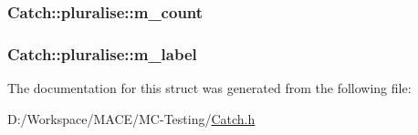 \subsubsection[{\texorpdfstring{m\+\_\+count}{m_count}}]{ Catch\+::pluralise\+::m\+\_\+count}\hypertarget{struct_catch_1_1pluralise_a4dce2fa13ec6f00fac09b2418265441e}{}\label{struct_catch_1_1pluralise_a4dce2fa13ec6f00fac09b2418265441e}
\subsubsection[{\texorpdfstring{m\+\_\+label}{m_label}}]{ Catch\+::pluralise\+::m\+\_\+label}\hypertarget{struct_catch_1_1pluralise_a8849cbdd3f11ebe7747597c8644e8793}{}\label{struct_catch_1_1pluralise_a8849cbdd3f11ebe7747597c8644e8793}


The documentation for this struct was generated from the following file\+:\begin{DoxyCompactItemize}
\item 
D\+:/\+Workspace/\+M\+A\+C\+E/\+M\+C-\/\+Testing/\hyperlink{_catch_8h}{Catch.\+h}\end{DoxyCompactItemize}
